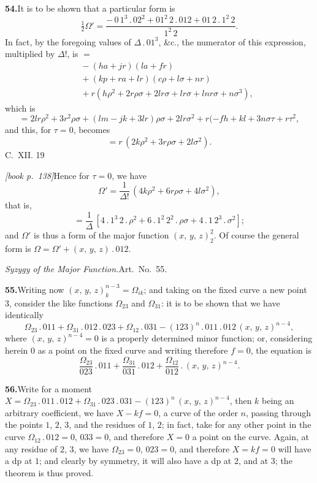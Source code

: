 \documentclass[11pt,a4paper]{article}
\theoremstyle{plain}
\theoremstyle{definition}
\theoremstyle{remark}
\begin{document}
\medskip\noindent\textbf{54.}\quad It is to be shown that a particular form is
\[
\tfrac{1}{2}\Omega' = \frac{-\,0\,1^3\,.\,02^2 + 01^{2}\,2\,.\,012 + 01\,2\,.\,1^{2}\,2}{1^{2}\,2}.
\]
In fact, by the foregoing values of $\Delta\,.\,01^3$, \&c., the numerator of this expression, multiplied by $\Delta!$, is $=$
\begin{align*}
&\quad -(ha + jr)(la + fr)\\
&\quad + (kp + ra + lr)(c\rho + l\sigma + nr)\\
&\quad + r(h\rho^{2} + 2r\rho\sigma + 2lr\sigma + lr\sigma + lnr\sigma + n\sigma^{3}),
\end{align*}
which is
\[
= 2lr\rho^{2} + 3r^{2}\rho\sigma + (lm - jk + 3lr)\rho\sigma + 2lr\sigma^{2} + r(-fh + kl + 3n\sigma\tau + r\tau^{2},
\]
and this, for $\tau = 0$, becomes
\[
= r\,(2k\rho^{2} + 3r\rho\sigma + 2l\sigma^{2}).
\]
C.\ XII. \hfill 19

\medskip\noindent\textit{[book p.~138]}\quad Hence for $\tau = 0$, we have
\[
\Omega' = \frac{1}{\Delta!}\,(4k\rho^{2} + 6r\rho\sigma + 4l\sigma^{2}),
\]
that is,
\[
= \frac{1}{\Delta}\,[4\,.\,1^{3}\,2\,.\,\rho^{2} + 6\,.\,1^{2}\,2^{2}\,.\,\rho\sigma + 4\,.\,1\,2^{3}\,.\,\sigma^{2}];
\]
and $\Omega'$ is thus a form of the major function $(x,\,y,\,z)_{2}^{2}$. Of course the general form is $\Omega = \Omega' + (x,\,y,\,z)\,.\,012$.

\medskip\noindent\textit{Syzygy of the Major Function.}\quad Art.\ No.\ 55.

\medskip\noindent\textbf{55.}\quad Writing now $(x,\,y,\,z)_{k}^{n-3} = \Omega_{ik}$; and taking on the fixed curve a new point $3$, consider the like functions $\Omega_{23}$ and $\Omega_{31}$: it is to be shown that we have identically
\[
\Omega_{23}\,.\,011 + \Omega_{31}\,.\,012\,.\,023 + \Omega_{12}\,.\,031 - (123)^{n}\,.\,011\,.\,012\,(x,\,y,\,z)^{n-4},
\]
where $(x,\,y,\,z)^{n-4} = 0$ is a properly determined minor function; or, considering herein $0$ as a point on the fixed curve and writing therefore $f = 0$, the equation is
\[
\frac{\Omega_{23}}{023}\,.\,011 + \frac{\Omega_{31}}{031}\,.\,012 + \frac{\Omega_{12}}{012}\,.\,(x,\,y,\,z)^{n-4}.
\]

\medskip\noindent\textbf{56.}\quad Write for a moment $X = \Omega_{23}\,.\,011\,.\,012 + \Omega_{31}\,.\,023\,.\,031 - (123)^{n}\,(x,\,y,\,z)^{n-4}$, then $k$ being an arbitrary coefficient, we have $X - kf = 0$, a curve of the order $n$, passing through the points $1$, $2$, $3$, and the residues of $1$, $2$; in fact, take for any other point in the curve $\Omega_{12}\,.\,012 = 0$, $033 = 0$, and therefore $X = 0$ a point on the curve. Again, at any residue of $2$, $3$, we have $\Omega_{23} = 0$, $023 = 0$, and therefore $X = kf = 0$ will have a dp at $1$; and clearly by symmetry, it will also have a dp at $2$, and at $3$; the theorem is thus proved.
\end{document}
